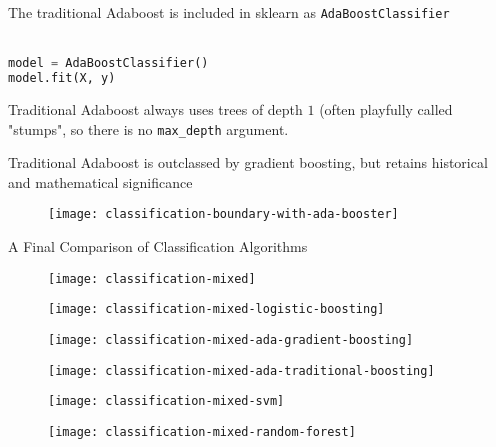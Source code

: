%
\begin{frame}[fragile]
The traditional Adaboost is included in sklearn as \texttt{AdaBoostClassifier}\\~\\

\begin{lstlisting}[language=python]
model = AdaBoostClassifier()
model.fit(X, y)
\end{lstlisting}

Traditional Adaboost always uses trees of depth $1$ (often playfully called "stumps", so there is no \texttt{max\_depth} argument.
\end{frame}

%
\begin{frame}[fragile]
Traditional Adaboost is outclassed by gradient boosting, but retains historical and mathematical significance

  \begin{figure}
    \texttt{[image: classification-boundary-with-ada-booster]}
  \end{figure}
 
\end{frame}
%
\begin{frame}{A Final Comparison of Classification Algorithms}

  \begin{figure}
    \texttt{[image: classification-mixed]}
  \end{figure}

\end{frame}
%
\begin{frame}

  \begin{figure}
    \texttt{[image: classification-mixed-logistic-boosting]}
  \end{figure}
  
\end{frame}
%
\begin{frame}

  \begin{figure}
    \texttt{[image: classification-mixed-ada-gradient-boosting]}
  \end{figure}
  
\end{frame}
%
\begin{frame}

  \begin{figure}
    \texttt{[image: classification-mixed-ada-traditional-boosting]}
  \end{figure}
  
\end{frame}
%
\begin{frame}

  \begin{figure}
    \texttt{[image: classification-mixed-svm]}
  \end{figure}
  
\end{frame}
%
\begin{frame}

  \begin{figure}
    \texttt{[image: classification-mixed-random-forest]}
  \end{figure}
  
\end{frame}